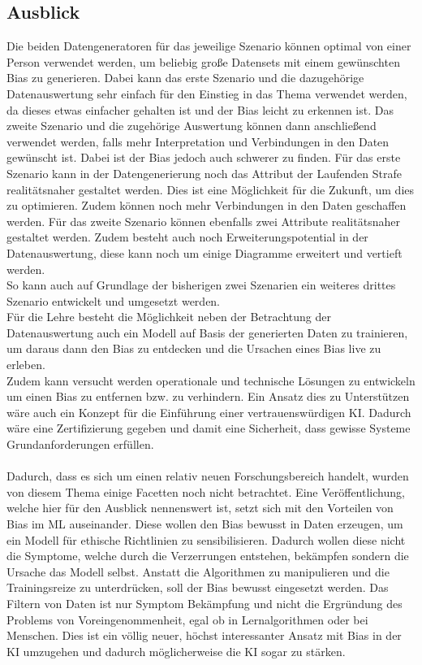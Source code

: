 \begin{onehalfspace}
\section{Ausblick}
\label{ausblick}
Die beiden Datengeneratoren für das jeweilige Szenario können optimal von einer Person verwendet werden, um beliebig große Datensets mit einem gewünschten Bias zu generieren. Dabei kann das erste Szenario und die dazugehörige Datenauswertung sehr einfach für den Einstieg in das Thema verwendet werden, da dieses etwas einfacher gehalten ist und der Bias leicht zu erkennen ist. Das zweite Szenario und die zugehörige Auswertung können dann anschließend verwendet werden, falls mehr Interpretation und Verbindungen in den Daten gewünscht ist. Dabei ist der Bias jedoch auch schwerer zu finden. Für das erste Szenario kann in der Datengenerierung noch das Attribut der Laufenden Strafe realitätsnaher gestaltet werden. Dies ist eine Möglichkeit für die Zukunft, um dies zu optimieren. Zudem können noch mehr Verbindungen in den Daten geschaffen werden. Für das zweite Szenario können ebenfalls zwei Attribute realitätsnaher gestaltet werden. Zudem besteht auch noch Erweiterungspotential in der Datenauswertung, diese kann noch um einige Diagramme erweitert und vertieft werden.\\
So kann auch auf Grundlage der bisherigen zwei Szenarien ein weiteres drittes Szenario entwickelt und umgesetzt werden.\\
Für die Lehre besteht die Möglichkeit neben der Betrachtung der Datenauswertung auch ein Modell auf Basis der generierten Daten zu trainieren, um daraus dann den Bias zu entdecken und die Ursachen eines Bias live zu erleben.\\ 
Zudem kann versucht werden operationale und technische Lösungen zu entwickeln um einen Bias zu entfernen bzw. zu verhindern. Ein Ansatz dies zu Unterstützen wäre auch ein Konzept für die Einführung einer vertrauenswürdigen KI. Dadurch wäre eine Zertifizierung gegeben und damit eine Sicherheit, dass gewisse Systeme Grundanforderungen erfüllen.\\\\
Dadurch, dass es sich um einen relativ neuen Forschungsbereich handelt, wurden von diesem Thema einige Facetten noch nicht betrachtet. Eine Veröffentlichung, welche hier für den Ausblick nennenswert ist, setzt sich mit den Vorteilen von Bias im ML auseinander. Diese wollen den Bias bewusst in Daten erzeugen, um ein Modell für ethische Richtlinien zu sensibilisieren. Dadurch wollen diese nicht die Symptome, welche durch die Verzerrungen entstehen, bekämpfen sondern die Ursache das Modell selbst. Anstatt die Algorithmen zu manipulieren und die Trainingsreize zu unterdrücken, soll der Bias bewusst eingesetzt werden. Das Filtern von Daten ist nur Symptom Bekämpfung und nicht die Ergründung des Problems von Voreingenommenheit, egal ob in Lernalgorithmen oder bei Menschen. Dies ist ein völlig neuer, höchst interessanter Ansatz mit Bias in der KI umzugehen und dadurch möglicherweise die KI sogar zu stärken.\cite{Fabi2022}
\end{onehalfspace}
\newpage
